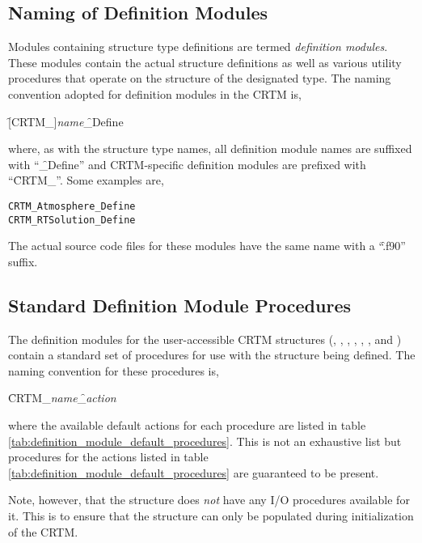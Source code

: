 \subsection{Naming of Definition Modules}

Modules containing structure type definitions are termed \textit{definition modules}. These modules contain the actual structure definitions as well as various utility procedures that operate on the structure of the designated type. The naming convention adopted for definition modules in the CRTM is, 

\hspace{0.5cm}\f{[CRTM\_]}\textit{name}\f{\_Define} 

where, as with the structure type names, all definition module names are suffixed with ``\f{\_Define}'' and CRTM-specific definition modules are prefixed with ``\f{CRTM\_}''. Some examples are,

\begin{alltt}
  CRTM_Atmosphere_Define
  CRTM_RTSolution_Define\end{alltt}

The actual source code files for these modules have the same name with a ``\f{.f90}'' suffix.



\subsection{Standard Definition Module Procedures}

The definition modules for the user-accessible CRTM structures (\Atmosphere, \Cloud, \Aerosol, \Surface, \Geometry, \RTSolution, and \Options) contain a standard set of procedures for use with the structure being defined. The naming convention for these procedures is,

\hspace{0.5cm}\f{CRTM\_}\textit{name}\f{\_}\textit{action}

where the available default actions for each procedure are listed in table \ref{tab:definition_module_default_procedures}. This is not an exhaustive list but procedures for the actions listed in table \ref{tab:definition_module_default_procedures} are guaranteed to be present.

Note, however, that the \ChannelInfo structure does \emph{not} have any I/O procedures available for it. This is to ensure that the \ChannelInfo structure can only be populated during initialization of the CRTM.


